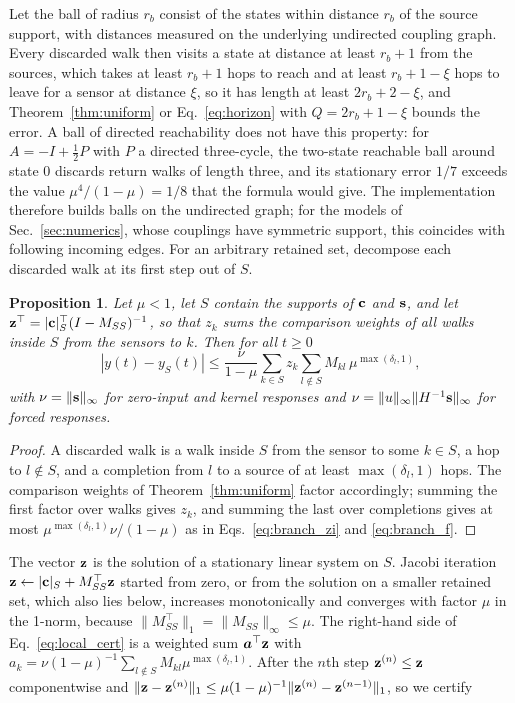 \documentclass[aps,pra,superscriptaddress,floatfix,longbibliography,twocolumn]{revtex4-2}
\newcommand{\bc}{{\bf c}}
\newcommand{\bs}{{\bf s}}
\newcommand{\bz}{{\bf z}}
\newtheorem{proposition}{Proposition}
\begin{document}
Let the ball of radius $r_b$ consist of the states within distance $r_b$ of the source support, with distances measured on the underlying undirected coupling graph. Every discarded walk then visits a state at distance at least $r_b+1$ from the sources, which takes at least $r_b+1$ hops to reach and at least $r_b+1-\xi$ hops to leave for a sensor at distance $\xi$, so it has length at least $2r_b+2-\xi$, and Theorem~\ref{thm:uniform} or Eq.~\eqref{eq:horizon} with $Q=2r_b+1-\xi$ bounds the error. A ball of directed reachability does not have this property: for $A=-I+\tfrac12P$ with $P$ a directed three-cycle, the two-state reachable ball around state 0 discards return walks of length three, and its stationary error $1/7$ exceeds the value $\mu^4/(1-\mu)=1/8$ that the formula would give. The implementation therefore builds balls on the undirected graph; for the models of Sec.~\ref{sec:numerics}, whose couplings have symmetric support, this coincides with following incoming edges. For an arbitrary retained set, decompose each discarded walk at its first step out of $S$.
\begin{proposition}\label{prop:local}
Let $\mu<1$, let $S$ contain the supports of $\bc$ and $\bs$, and let $\bz^\top=|\bc|_S^\top(I-M_{SS})^{-1}$, so that $z_k$ sums the comparison weights of all walks inside $S$ from the sensors to $k$. Then for all $t\ge0$
\begin{equation}\label{eq:local_cert}
|y(t)-y_S(t)|\le\frac{\nu}{1-\mu}\sum_{k\in S}z_k\sum_{l\notin S}M_{kl}\,\mu^{\max(\delta_l,1)},
\end{equation}
with $\nu=\|\bs\|_\infty$ for zero-input and kernel responses and $\nu=\|u\|_\infty\|H^{-1}\bs\|_\infty$ for forced responses.
\end{proposition}
\begin{proof}
A discarded walk is a walk inside $S$ from the sensor to some $k\in S$, a hop to $l\notin S$, and a completion from $l$ to a source of at least $\max(\delta_l,1)$ hops. The comparison weights of Theorem~\ref{thm:uniform} factor accordingly; summing the first factor over walks gives $z_k$, and summing the last over completions gives at most $\mu^{\max(\delta_l,1)}\nu/(1-\mu)$ as in Eqs.~\eqref{eq:branch_zi} and \eqref{eq:branch_f}.
\end{proof}
The vector $\bz$ is the solution of a stationary linear system on $S$. Jacobi iteration $\bz\leftarrow|\bc|_S+M_{SS}^\top\bz$ started from zero, or from the solution on a smaller retained set, which also lies below, increases monotonically and converges with factor $\mu$ in the 1-norm, because $\|M_{SS}^\top\|_1=\|M_{SS}\|_\infty\le\mu$. The right-hand side of Eq.~\eqref{eq:local_cert} is a weighted sum $\bm{a}^\top\bz$ with $a_k=\nu(1-\mu)^{-1}\sum_{l\notin S}M_{kl}\mu^{\max(\delta_l,1)}$. After the $n$th step $\bz^{(n)}\le\bz$ componentwise and $\|\bz-\bz^{(n)}\|_1\le\mu(1-\mu)^{-1}\|\bz^{(n)}-\bz^{(n-1)}\|_1$, so we certify
\end{document}
